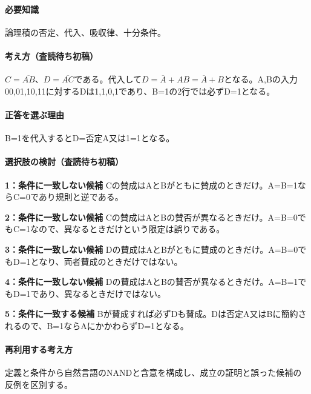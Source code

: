 \paragraph{必要知識} 論理積の否定、代入、吸収律、十分条件。

\paragraph{考え方（査読待ち初稿）} \(C=\overline{AB}\)、\(D=\overline{AC}\)である。代入して\(D=\overline A+AB=\overline A+B\)となる。A,Bの入力00,01,10,11に対するDは1,1,0,1であり、B=\allowbreak{}1の2行では必ずD=\allowbreak{}1となる。

\paragraph{正答を選ぶ理由} B=\allowbreak{}1を代入するとD=否定A又は1=\allowbreak{}1となる。

\paragraph{選択肢の検討（査読待ち初稿）}\mbox{}\par

\noindent\textbf{1：条件に一致しない候補} Cの賛成はAとBがともに賛成のときだけ。A=\allowbreak{}B=\allowbreak{}1ならC=\allowbreak{}0であり規則と逆である。\par

\noindent\textbf{2：条件に一致しない候補} Cの賛成はAとBの賛否が異なるときだけ。A=\allowbreak{}B=\allowbreak{}0でもC=\allowbreak{}1なので、異なるときだけという限定は誤りである。\par

\noindent\textbf{3：条件に一致しない候補} Dの賛成はAとBがともに賛成のときだけ。A=\allowbreak{}B=\allowbreak{}0でもD=\allowbreak{}1となり、両者賛成のときだけではない。\par

\noindent\textbf{4：条件に一致しない候補} Dの賛成はAとBの賛否が異なるときだけ。A=\allowbreak{}B=\allowbreak{}1でもD=\allowbreak{}1であり、異なるときだけではない。\par

\noindent\textbf{5：条件に一致する候補} Bが賛成すれば必ずDも賛成。Dは否定A又はBに簡約されるので、B=\allowbreak{}1ならAにかかわらずD=\allowbreak{}1となる。\par

\paragraph{再利用する考え方} 定義と条件から自然言語のNANDと含意を構成し、成立の証明と誤った候補の反例を区別する。

